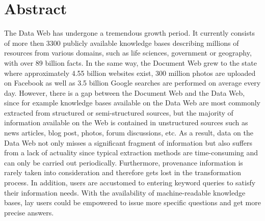 \begingroup
\let\clearpage\relax
\let\cleardoublepage\relax
\let\cleardoublepage\relax

\chapter*{Abstract}

The Data Web has undergone a tremendous growth period.
It currently consists of more then 3300 publicly available knowledge bases describing millions of resources from various domains, such as life sciences, government or geography, with over 89 billion facts.
In the same way, the Document Web grew to the state where approximately 4.55 billion websites exist, 300 million photos are uploaded on Facebook as well as 3.5 billion Google searches are performed on average every day.
However, there is a gap between the Document Web and the Data Web, since for example knowledge bases available on the Data Web are most commonly extracted from structured or semi-structured sources, but the majority of information available on the Web is contained in unstructured sources such as news articles, blog post, photos, forum discussions, etc.
As a result, data on the Data Web not only misses a significant fragment of information but also suffers from a lack of actuality since typical extraction methods are time-consuming and can only be carried out periodically.
Furthermore, provenance information is rarely taken into consideration and therefore gets lost in the transformation process.
In addition, users are accustomed to entering keyword queries to satisfy their information needs.
With the availability of machine-readable knowledge bases, lay users could be empowered to issue more specific questions and get more precise answers.

